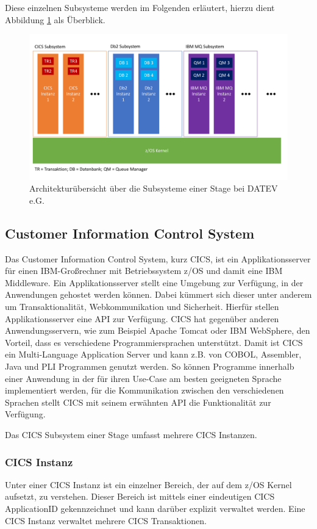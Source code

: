 Diese einzelnen Subsysteme werden im Folgenden erläutert, hierzu dient Abbildung \ref{fig:archüber} als Überblick.

\begin{figure}[h!]
\centering
\includegraphics[width=\textwidth]{figures/architektur.pdf}
\caption{Architekturübersicht über die Subsysteme einer Stage bei DATEV e.G.}
\label{fig:archüber}
\end{figure}

\subsection{Customer Information Control System}\label{cics}
Das Customer Information Control System, kurz CICS, ist ein Applikationsserver für einen IBM-Großrechner mit Betriebssystem z/OS und damit eine IBM Middleware.
Ein Applikationsserver stellt eine Umgebung zur Verfügung, in der Anwendungen gehostet werden können.
Dabei kümmert sich dieser unter anderem um Transaktionalität, Webkommunikation und Sicherheit.
Hierfür stellen Applikationsserver eine API zur Verfügung.
CICS hat gegenüber anderen Anwendungsservern, wie zum Beispiel \glqq Apache Tomcat\grqq{} oder \glqq IBM WebSphere\grqq,  den Vorteil, dass es verschiedene Programmiersprachen unterstützt.
Damit ist CICS ein Multi-Language Application Server und kann z.B. von COBOL, Assembler, Java und PLI Programmen genutzt werden.
So können Programme innerhalb einer Anwendung in der für ihren Use-Case am besten geeigneten Sprache implementiert werden, für die Kommunikation zwischen den verschiedenen Sprachen stellt  CICS mit seinem erwähnten API die Funktionalität zur Verfügung.
\cite[S. 4]{Rayns.2011}

Das CICS Subsystem einer Stage umfasst mehrere CICS Instanzen.

\subsubsection{CICS Instanz} 
Unter einer CICS Instanz ist ein einzelner Bereich, der auf dem z/OS Kernel aufsetzt, zu verstehen.
Dieser Bereich ist mittels einer eindeutigen CICS ApplicationID gekennzeichnet und kann darüber explizit verwaltet werden.
Eine CICS Instanz verwaltet mehrere CICS Transaktionen.

